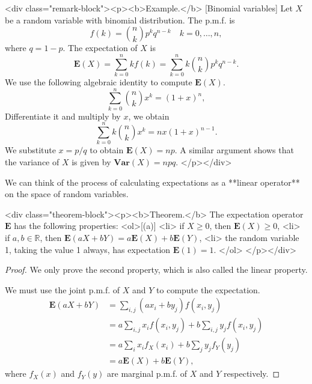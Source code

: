 <div class="remark-block"><p><b>Example.</b> [Binomial variables]
Let $X$ be a random variable with binomial distribution. The p.m.f. is 
$$\begin{equation}
    f(k) = \binom{n}{k} p^k q^{n-k} \quad k = 0,\dots, n,
\end{equation}$$
where $q = 1-p$. The expectation of $X$ is
$$\begin{equation}
    \mathbf{E}(X) = \sum_{k=0}^n k f(k) = \sum_{k=0}^n k\binom{n}{k} p^k q^{n-k}.
\end{equation}$$
We use the following algebraic identity to compute $\mathbf{E}(X)$.
$$$$$$$$\begin{equation}
    \label{eq:4.2}
    \tag{4-2}
    \sum_{k=0}^n \binom{n}{k} x^k = (1+x)^n, 
\end{equation}$$$$$$$$
Differentiate it and multiply by $x$, we obtain 
$$$$$$$$\begin{equation}
    \label{eq:4.3}
    \tag{4-3}
    \sum_{k=0}^n k \binom{n}{k} x^k = nx(1+x)^{n-1}. 
\end{equation}$$$$$$$$
We substitute $x = p / q$ to obtain $\mathbf{E}(X) = np$. A similar argument shows that the variance of $X$ is given by $\mathbf{Var}(X) = npq$. 
</p></div>

We can think of the process of calculating expectations as a **linear operator** on the space of random variables. 

<div class="theorem-block"><p><b>Theorem.</b> 
The expectation operator $\mathbf{E}$ has the following properties: 
<ol>[(a)]
    <li> if $X\geq 0$, then $\mathbf{E}(X) \geq 0$,
    <li> if $a, b \in \mathbb{R}$, then $\mathbf{E}(aX+bY) = a\mathbf{E}(X) + b\mathbf{E}(Y)$,
    <li> the random variable 1, taking the value 1 always, has expectation $\mathbf{E}(1) = 1$. 
</ol>
</p></div>

\begin{proof}
We only prove the second property, which is also called the linear property.

We must use the joint p.m.f. of $X$ and $Y$ to compute the expectation. 
$$\begin{equation}
    \begin{split}
        \mathbf{E}(aX+bY) &= \sum_{i, j} (ax_i + by_j) f(x_i, y_j) \\
        &= a \sum_{i,j} x_i f(x_i, y_j) + b\sum_{i,j} y_j f(x_i, y_j) \\
        &= a\sum_{i} x_i f_X(x_i) + b\sum_{j}y_j f_Y(y_j) \\ 
        &= a\mathbf{E}(X) + b\mathbf{E}(Y),
    \end{split}
\end{equation}$$
where $f_X(x)$ and $f_Y(y)$ are marginal p.m.f. of $X$ and $Y$ respectively.
\end{proof}

